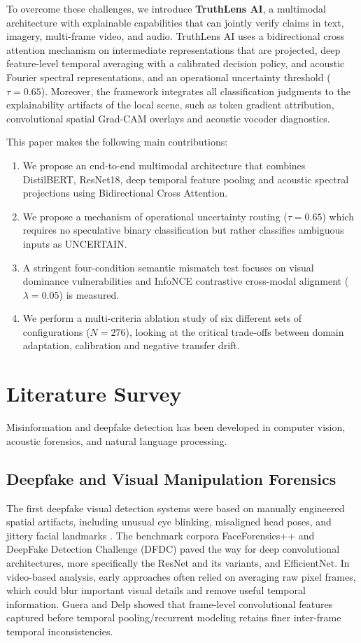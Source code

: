 \documentclass[conference]{IEEEtran}
\begin{document}
To overcome these challenges, we introduce \textbf{TruthLens AI}, a multimodal architecture with explainable capabilities that can jointly verify claims in text, imagery, multi-frame video, and audio. TruthLens AI uses a bidirectional cross attention mechanism on intermediate representations that are projected, deep feature-level temporal averaging with a calibrated decision policy, and acoustic Fourier spectral representations, and an operational uncertainty threshold ($\tau = 0.65$). Moreover, the framework integrates all classification judgments to the explainability artifacts of the local scene, such as token gradient attribution, convolutional spatial Grad-CAM overlays \cite{selvaraju2017gradcam} and acoustic vocoder diagnostics.

This paper makes the following main contributions:
\begin{enumerate}
    \item We propose an end-to-end multimodal architecture that combines DistilBERT, ResNet18, deep temporal feature pooling and acoustic spectral projections using Bidirectional Cross Attention.
    \item We propose a mechanism of operational uncertainty routing ($\tau = 0.65$) which requires no speculative binary classification but rather classifies ambiguous inputs as UNCERTAIN.
    \item A stringent four-condition semantic mismatch test focuses on visual dominance vulnerabilities and InfoNCE contrastive cross-modal alignment ($\lambda = 0.05$) is measured.
    \item We perform a multi-criteria ablation study of six different sets of configurations ($N = 276$), looking at the critical trade-offs between domain adaptation, calibration and negative transfer drift.
\end{enumerate}

\section{Literature Survey}
Misinformation and deepfake detection has been developed in computer vision, acoustic forensics, and natural language processing.

\subsection{Deepfake and Visual Manipulation Forensics}
The first deepfake visual detection systems were based on manually engineered spatial artifacts, including unusual eye blinking, misaligned head poses, and jittery facial landmarks \cite{rossler2019faceforensics}. The benchmark corpora FaceForensics++ \cite{rossler2019faceforensics} and DeepFake Detection Challenge (DFDC) \cite{dolhansky2020deepfake} paved the way for deep convolutional architectures, more specifically the ResNet \cite{he2016deep} and its variants, and EfficientNet. In video-based analysis, early approaches often relied on averaging raw pixel frames, which could blur important visual details and remove useful temporal information. Guera and Delp \cite{guera2018deepfake} showed that frame-level convolutional features captured before temporal pooling/recurrent modeling retains finer inter-frame temporal inconsistencies.
\end{document}

